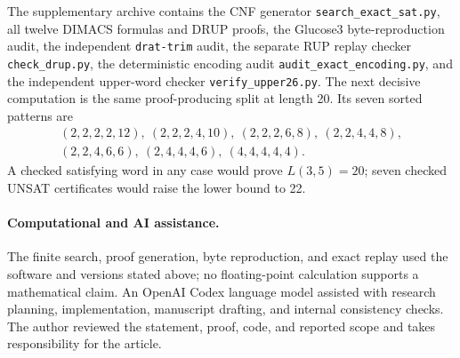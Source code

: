 \documentclass[11pt]{article}
\begin{document}
The supplementary archive contains the CNF generator
\texttt{search\_exact\_sat.py}, all twelve DIMACS formulas and DRUP proofs,
the Glucose3 byte-reproduction audit, the independent \texttt{drat-trim}
audit, the separate RUP replay checker \texttt{check\_drup.py}, the
deterministic encoding audit \texttt{audit\_exact\_encoding.py}, and the
independent upper-word checker \texttt{verify\_upper26.py}.  The next
decisive computation is the same proof-producing split at length 20.  Its
seven sorted patterns are
\[
\begin{gathered}
(2,2,2,2,12),\ (2,2,2,4,10),\ (2,2,2,6,8),\
(2,2,4,4,8),\\
(2,2,4,6,6),\ (2,4,4,4,6),\ (4,4,4,4,4).
\end{gathered}
\]
A checked satisfying word in any case would prove \(L(3,5)=20\); seven
checked UNSAT certificates would raise the lower bound to 22.

\paragraph{Computational and AI assistance.}
The finite search, proof generation, byte reproduction, and exact replay used
the software and versions stated above; no floating-point calculation
supports a mathematical claim.  An OpenAI Codex language model assisted with
research planning, implementation, manuscript drafting, and internal
consistency checks.  The author reviewed the statement, proof, code, and
reported scope and takes responsibility for the article.



\end{document}
